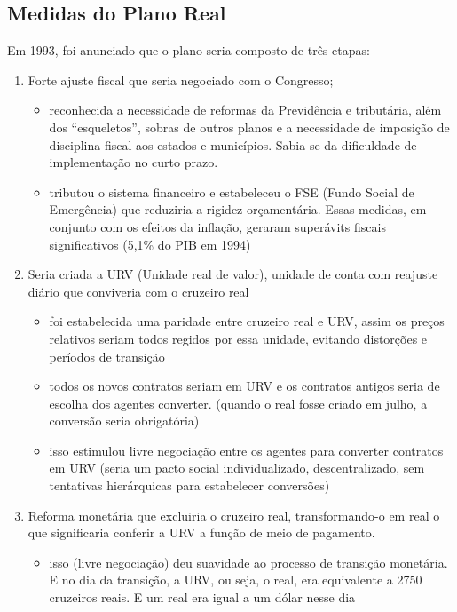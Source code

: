 \documentclass[a4paper,12pt]{article}[abntex2]
\begin{document}
\subsection{\textbf{Medidas do Plano Real}}
Em 1993, foi anunciado que o plano seria composto de três etapas:\begin{enumerate}
    \item Forte ajuste fiscal que seria negociado com o Congresso;\begin{itemize}
         \item reconhecida a necessidade de reformas da Previdência e tributária, além dos “esqueletos”, sobras de outros planos e a necessidade de imposição de disciplina fiscal aos estados e municípios. Sabia-se da dificuldade de implementação no curto prazo.
         \item tributou o sistema financeiro e estabeleceu o FSE (Fundo Social de Emergência) que reduziria a rigidez orçamentária. Essas medidas, em conjunto com os efeitos da inflação, geraram superávits fiscais significativos (5,1\% do PIB em 1994)
     \end{itemize}
     \item Seria criada a URV (Unidade real de valor), unidade de conta com reajuste diário que conviveria com o cruzeiro real\begin{itemize}
         \item foi estabelecida uma paridade entre cruzeiro real e URV, assim os preços relativos seriam todos regidos por essa unidade, evitando distorções e períodos de transição
         \item todos os novos contratos seriam em URV e os contratos antigos seria de escolha dos agentes converter. (quando o real fosse criado em julho, a conversão seria obrigatória)
         \item isso estimulou livre negociação entre os agentes para converter contratos em URV (seria um pacto social individualizado, descentralizado, sem tentativas hierárquicas para estabelecer conversões)
     \end{itemize}
     \item Reforma monetária que excluiria o cruzeiro real, transformando-o em real o que significaria conferir a URV a função de meio de pagamento.\begin{itemize}
         \item isso (livre negociação) deu suavidade ao processo de transição monetária. E no dia da transição, a URV, ou seja, o real, era equivalente a 2750 cruzeiros reais. E um real era igual a um dólar nesse dia

\end{itemize}
\end{enumerate}
\end{document}
